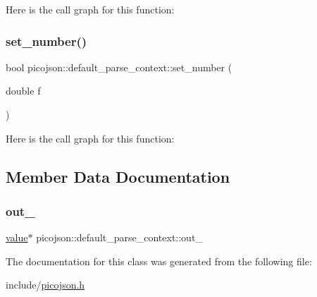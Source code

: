 Here is the call graph for this function\+:
\hypertarget{classpicojson_1_1default__parse__context_a9b2046a9cb6d66aad835b84ffda20b86}{}\label{classpicojson_1_1default__parse__context_a9b2046a9cb6d66aad835b84ffda20b86} 
\subsubsection{\texorpdfstring{set\+\_\+number()}{set\_number()}}
{\footnotesize\ttfamily bool picojson\+::default\+\_\+parse\+\_\+context\+::set\+\_\+number (\begin{DoxyParamCaption}\item[{double}]{f }\end{DoxyParamCaption})\hspace{0.3cm}{\ttfamily [inline]}}

Here is the call graph for this function\+:


\subsection{Member Data Documentation}
\hypertarget{classpicojson_1_1default__parse__context_a89547d73da32e470068649e54646ff19}{}\label{classpicojson_1_1default__parse__context_a89547d73da32e470068649e54646ff19} 
\subsubsection{\texorpdfstring{out\+\_\+}{out\_}}
{\footnotesize\ttfamily \hyperlink{classpicojson_1_1value}{value}$\ast$ picojson\+::default\+\_\+parse\+\_\+context\+::out\+\_\+\hspace{0.3cm}{\ttfamily [protected]}}



The documentation for this class was generated from the following file\+:\begin{DoxyCompactItemize}
\item 
include/\hyperlink{picojson_8h}{picojson.\+h}\end{DoxyCompactItemize}

